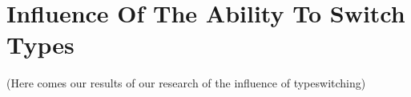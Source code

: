 \section{Influence Of The Ability To Switch Types}

(Here comes our results of our research of the influence of typeswitching)

